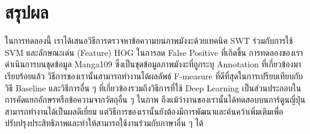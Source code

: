 \chapter{สรุปผล}
\label{chapter:conclusion}

ในการทดลองนี้ เราได้เสนอวิธีการตรวจหาข้อความบนภาพมังงะด้วยเทคนิค SWT ร่วมกับการใช้ SVM และลักษณะเด่น (Feature) HOG ในการลด False Positive ที่เกิดขึ้น การทดลองของเราดำเนินการบนชุดข้อมูล Manga109 ซึ่งเป็นชุดข้อมูลภาพมังงะที่ถูกระบุ Annotation ที่เกี่ยวข้องมาเรียบร้อยแล้ว วิธีการของเรานั้นสามารถทำงานได้ผลลัพธ์ F-measure ที่ดีที่สุดในการเปรียบเทียบกับวิธี Baseline และวิธีการอื่น ๆ ที่เกี่ยวข้องรวมถึงวิธีการที่ใช้ Deep Learning เป็นส่วนประกอบในการคัดแยกอักษรหรือข้อความจากวัตถุอื่น ๆ ในภาพ ถึงแม้ว่างานของเรานั้นได้ทดสอบบนการ์ตูนญี่ปุ่นสามารถทำงานได้เป็นผลดีเยี่ยม แต่วิธีการของเรานั้นยังต้องมีการพัฒนาและค้นคว้าเพิ่มเติมเพื่อปรับปรุงประสิทธิภาพและทำให้สามารถใช้งานร่วมกับภาษาอื่น ๆ ได้